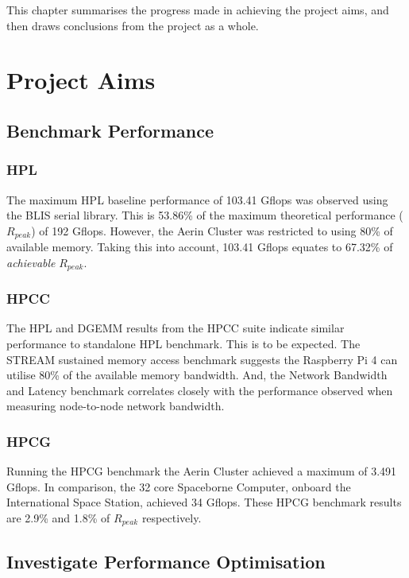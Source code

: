 This chapter summarises the progress made in achieving the project aims, and then draws conclusions from the project as a whole.


%
%
\section{Project Aims}



%
%
\subsection{Benchmark Performance}

\subsubsection{HPL}

The maximum HPL baseline performance of 103.41 Gflops was observed using the BLIS serial library. This is 53.86\% of the maximum theoretical performance ($R_{peak}$) of 192 Gflops. However, the Aerin Cluster was restricted to using 80\% of available memory. Taking this into account, 103.41 Gflops equates to 67.32\% of \emph{achievable} $R_{peak}$.


\subsubsection{HPCC}

The HPL and DGEMM results from the HPCC suite indicate similar performance to standalone HPL benchmark. This is to be expected. The STREAM sustained memory access benchmark suggests the Raspberry Pi 4 can utilise 80\% of the available memory bandwidth. And, the Network Bandwidth and Latency benchmark correlates closely with the performance observed when measuring node-to-node network bandwidth.


\subsubsection{HPCG}

Running the HPCG benchmark the Aerin Cluster achieved a maximum of 3.491 Gflops. In comparison, the 32 core Spaceborne Computer, onboard the International Space Station, achieved 34 Gflops. These HPCG benchmark results are 2.9\% and 1.8\% of $R_{peak}$ respectively.


%
%
\subsection{Investigate Performance Optimisation}

